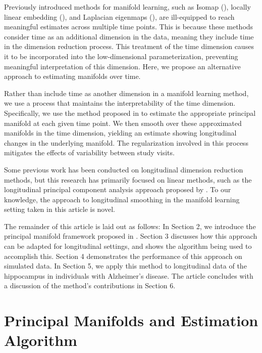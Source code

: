\documentclass[11pt,reqno]{article}
\theoremstyle{definition}
\begin{document}
Previously introduced methods for manifold learning, such as Isomap (\cite{tenenbaumGlobalGeometricFramework2000}), locally linear embedding (\cite{roweisNonlinearDimensionalityReduction2000}), and Laplacian eigenmaps (\cite{belkinLaplacianEigenmapsDimensionality2003a}), are ill-equipped to reach meaningful estimates across multiple time points. This is because these methods consider time as an additional dimension in the data, meaning they include time in the dimension reduction process. This treatment of the time dimension causes it to be incorporated into the low-dimensional parameterization, preventing meaningful interpretation of this dimension. Here, we propose an alternative approach to estimating manifolds over time.

Rather than include time as another dimension in a manifold learning method, we use a process that maintains the interpretability of the time dimension. Specifically, we use the method proposed in \cite{mengPrincipalManifoldEstimation2021} to estimate the appropriate principal manifold at each given time point. We then smooth over these approximated manifolds in the time dimension, yielding an estimate showing longitudinal changes in the underlying manifold. The regularization involved in this process mitigates the effects of variability between study visits.

Some previous work has been conducted on longitudinal dimension reduction methods, but this research has primarily focused on linear methods, such as the longitudinal principal component analysis approach proposed by \cite{kinsonLongitudinalPrincipalComponent2020}. To our knowledge, the approach to longitudinal smoothing in the manifold learning setting taken in this article is novel.

The remainder of this article is laid out as follows: In Section 2, we introduce the principal manifold framework proposed in \cite{mengPrincipalManifoldEstimation2021}. Section 3 discusses how this approach can be adapted for longitudinal settings, and shows the algorithm being used to accomplish this. Section 4 demonstrates the performance of this approach on simulated data. In Section 5, we apply this method to longitudinal data of the hippocampus in individuals with Alzheimer's disease. The article concludes with a discussion of the method's contributions in Section 6.

\section{Principal Manifolds and Estimation Algorithm}
\end{document}
